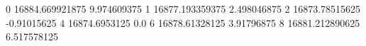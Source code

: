 0 16884.669921875 9.974609375
1 16877.193359375 2.498046875
2 16873.78515625 -0.91015625
4 16874.6953125 0.0
6 16878.61328125 3.91796875
8 16881.212890625 6.517578125
